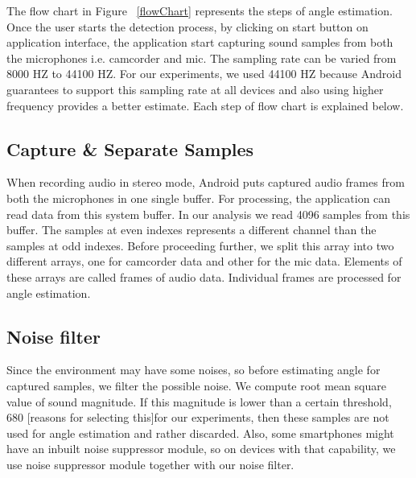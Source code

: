 The flow chart in Figure ~\ref{flowChart} represents the steps of angle estimation. Once the user starts the detection process, by clicking on start button on application interface, the application start capturing sound samples from both the microphones i.e. camcorder and mic. The sampling rate can be varied from 8000 HZ to 44100 HZ. For our experiments, we used 44100 HZ because Android guarantees to support this sampling rate at all devices and also using higher frequency provides a better estimate. Each step of flow chart is explained below.
\subsection{Capture \& Separate Samples }
When recording audio in stereo mode, Android puts captured audio frames from both the microphones in one single buffer. For processing, the application can read data from this system buffer. In our analysis we read 4096 samples from this buffer. The samples at even indexes represents a different channel than the samples at odd indexes. Before proceeding further, we split this array into two different arrays, one for camcorder data and other for the mic data. Elements of these arrays are called frames of audio data. Individual frames are processed for angle estimation. 

\subsection{Noise filter}
Since the environment may have some noises, so before estimating angle for captured samples, we filter the possible noise. We compute root mean square value of sound magnitude. If this magnitude is lower than a certain threshold, 680 [reasons for selecting this]for our experiments, then these samples are not used for angle estimation and rather discarded. Also, some smartphones might have an inbuilt noise suppressor module, so on devices with that capability, we use noise suppressor module together with our noise filter.

